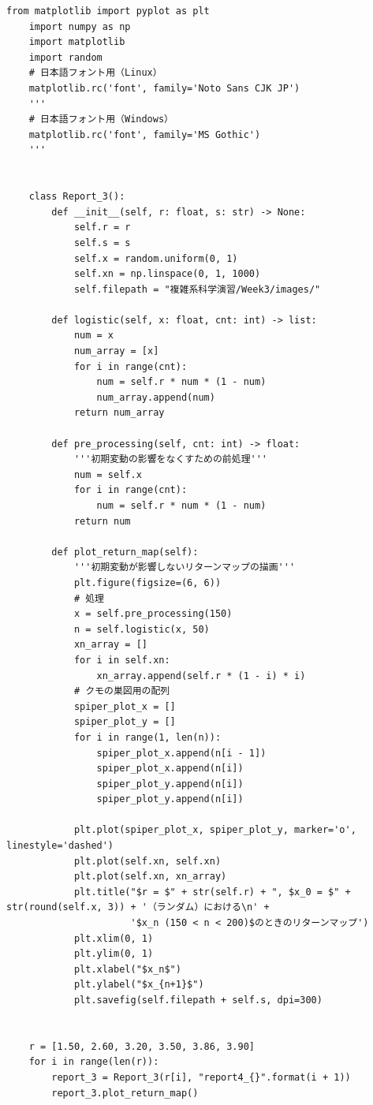 \begin{lstlisting}[caption=report3.py]
    from matplotlib import pyplot as plt
    import numpy as np
    import matplotlib
    import random
    # 日本語フォント用（Linux）
    matplotlib.rc('font', family='Noto Sans CJK JP')
    '''
    # 日本語フォント用（Windows）
    matplotlib.rc('font', family='MS Gothic')
    '''
    
    
    class Report_3():
        def __init__(self, r: float, s: str) -> None:
            self.r = r
            self.s = s
            self.x = random.uniform(0, 1)
            self.xn = np.linspace(0, 1, 1000)
            self.filepath = "複雑系科学演習/Week3/images/"
    
        def logistic(self, x: float, cnt: int) -> list:
            num = x
            num_array = [x]
            for i in range(cnt):
                num = self.r * num * (1 - num)
                num_array.append(num)
            return num_array
    
        def pre_processing(self, cnt: int) -> float:
            '''初期変動の影響をなくすための前処理'''
            num = self.x
            for i in range(cnt):
                num = self.r * num * (1 - num)
            return num
    
        def plot_return_map(self):
            '''初期変動が影響しないリターンマップの描画'''
            plt.figure(figsize=(6, 6))
            # 処理
            x = self.pre_processing(150)
            n = self.logistic(x, 50)
            xn_array = []
            for i in self.xn:
                xn_array.append(self.r * (1 - i) * i)
            # クモの巣図用の配列
            spiper_plot_x = []
            spiper_plot_y = []
            for i in range(1, len(n)):
                spiper_plot_x.append(n[i - 1])
                spiper_plot_x.append(n[i])
                spiper_plot_y.append(n[i])
                spiper_plot_y.append(n[i])
    
            plt.plot(spiper_plot_x, spiper_plot_y, marker='o', linestyle='dashed')
            plt.plot(self.xn, self.xn)
            plt.plot(self.xn, xn_array)
            plt.title("$r = $" + str(self.r) + ", $x_0 = $" + str(round(self.x, 3)) + '（ランダム）における\n' +
                      '$x_n (150 < n < 200)$のときのリターンマップ')
            plt.xlim(0, 1)
            plt.ylim(0, 1)
            plt.xlabel("$x_n$")
            plt.ylabel("$x_{n+1}$")
            plt.savefig(self.filepath + self.s, dpi=300)
    
    
    r = [1.50, 2.60, 3.20, 3.50, 3.86, 3.90]
    for i in range(len(r)):
        report_3 = Report_3(r[i], "report4_{}".format(i + 1))
        report_3.plot_return_map()
    
\end{lstlisting}